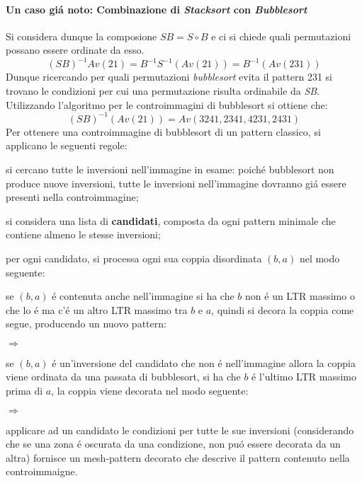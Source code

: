 \paragraph*{Un caso gi\'a noto: Combinazione di \textit{Stacksort} con \textit{Bubblesort}} Si considera dunque la composione $SB = S\circ{B}$ e ci si chiede quali permutazioni possano essere ordinate da esso.$$(SB)^{-1}Av(21)=B^{-1}S^{-1}(Av(21))=B^{-1}(Av(231))$$
Dunque ricercando per quali permutazioni \textit{bubblesort} evita il pattern 231 si trovano le condizioni per cui una permutazione risulta ordinabile da \textit{SB}.\\
Utilizzando l'algoritmo per le controimmagini di bubblesort\cite{albert2010inverse} si ottiene che:$$(SB)^{-1}(Av(21))=Av(3241, 2341, 4231, 2431)$$
Per ottenere una controimmagine di bubblesort di un pattern classico, si applicano le seguenti regole:
\begin{description}
	\item si cercano tutte le inversioni nell'immagine in esame: poich\'e bubblesort non produce nuove inversioni, tutte le inversioni nell'immagine dovranno gi\'a essere presenti nella controimmagine;
	\item si considera una lista di \textbf{candidati}, composta da ogni pattern minimale che contiene almeno le stesse inversioni;
	\item per ogni candidato, si processa ogni sua coppia disordinata $(b,a)$ nel modo seguente:
	\begin{description}
	\item se $(b,a)$ \'e contenuta anche nell'immagine si ha che $b$ non \'e un LTR massimo o che lo \'e ma c'\'e un altro LTR massimo tra $b$ e $a$, quindi si decora la coppia come segue, producendo un nuovo pattern:
	\begin{center}
		$\Rightarrow$
	\end{center}
	\item se $(b,a)$ \'e un'inversione del candidato che non \'e nell'immagine allora la coppia viene ordinata da una passata di bubblesort, si ha che $b$ \'e l'ultimo LTR massimo prima di $a$, la coppia viene decorata nel modo seguente:
	\begin{center}
		$\Rightarrow$\\
	\end{center}
	\end{description}
	\item applicare ad un candidato le condizioni per tutte le sue inversioni (considerando che se una zona \'e oscurata da una condizione, non pu\'o essere decorata da un altra) fornisce un mesh-pattern decorato che descrive il pattern contenuto nella controimmaigne.
\end{description}
